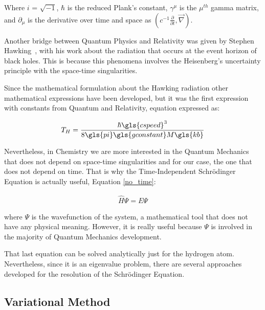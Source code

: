 Where $i$ = $\sqrt{-1}$, $\hbar$ is the reduced Plank's constant, $\gamma^{\mu}$ is the $\mu^{th}$ gamma matrix, and
$\partial_{\mu}$ is the derivative over time and space as $\left( c^{-1}\frac{\partial}{\partial t}, \vec{\nabla} \right)$.


Another bridge between Quantum Physics and Relativity was given by Stephen
Hawking~\cite{HAWKING1974}, with his work about the radiation that occurs at
the event horizon of black holes. This is because this phenomena involves the
Heisenberg's uncertainty principle with the space-time singularities. 

Since the mathematical formulation about the Hawking radiation other
mathematical expressions have been developed, but it was the first
expression with constants from Quantum and Relativity, 
equation expressed as:

\begin{align}
T_{H} = \frac{\hbar \gls{cspeed}^{3}}{8\gls{pi} \gls{gconstant}M \gls{kb}}
\end{align}

Nevertheless, in Chemistry we are more interested in the Quantum Mechanics that
does not depend on space-time singularities and for our case, the one that does
not depend on time.  That is why the Time-Independent Schrödinger Equation is
actually useful, Equation \ref{no_time}:

\begin{align}
\widehat{H}\Psi = E\Psi 
\label{no_time}
\end{align}

\noindent where $\Psi$ is the wavefunction of the system, a mathematical tool that
does not have any physical meaning. However, it is really useful because $\Psi$ is
involved in the majority of Quantum Mechanics development.

That last equation can be solved analytically just for the hydrogen atom.
Nevertheless, since
it is an eigenvalue problem,
there are several approaches developed for the resolution of the Schrödinger Equation.

\subsection{Variational Method}

